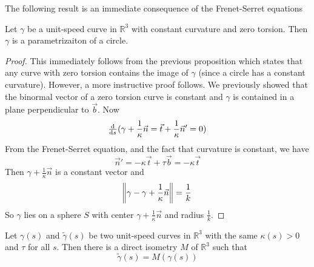 The following result is an immediate consequence of the Frenet-Serret equations

\begin{proposition}
  Let \(\gamma\) be a unit-speed curve in \(\mathbb{R}^{3}\) with constant curvature and zero
  torsion. Then \(\gamma\) is a parametrizaiton of a circle.
  \begin{proof}
    This immediately follows from the previous proposition which states that any
    curve with zero torsion contains the image of \(\gamma\) (since a circle has a
    constant curvature). However, a more instructive proof follows. We
    previously showed that the binormal vector of a zero torsion curve is
    constant and \(\gamma\) is contained in a plane perpendicular to \(\vec{b}\). Now
    \[
\od{}{s}(\gamma + \frac{1}{\kappa}\vec{n} = \vec{t} + \frac{1}{\kappa}\vec{n}' = 0)
\]
    From the Frenet-Serret equation, and the fact that curvature is constant, we
    have
    \[
\vec{n}' = -\kappa \vec{t} + \tau \vec{b} = -\kappa \vec{t}
\]
    Then \(\gamma + \frac{1}{\kappa}\vec{n}\) is a constant vector and
    \[
\norm{\gamma - \gamma + \frac{1}{\kappa}\vec{n}} = \frac{1}{k}
\]
    So \(\gamma\) lies on a sphere \(S\) with center \(\gamma + \frac{1}{\kappa}\vec{n}\) and radius
    \(\frac{1}{k}\).
  \end{proof}
\end{proposition}

\begin{theorem}
  Let \(\gamma(s)\) and \(\tilde{\gamma}(s)\) be two unit-speed curves in \(\mathbb{R}^{3}\) with the
  same \(\kappa(s)>0\) and \(\tau\) for all \(s\). Then there is a direct isometry \(M\) of
  \(\mathbb{R}^{3}\) such that
  \[
\tilde{\gamma}(s) = M(\gamma(s))
\]
\end{theorem}
